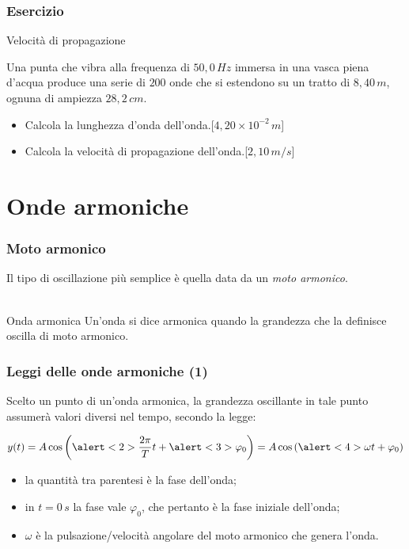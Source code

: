 \documentclass[]{beamer}
\theoremstyle{plain}
\begin{document}
\begin{frame}
\frametitle{Esercizio}
\begin{exampleblock}{Velocità di propagazione}
  \small{Una punta che vibra alla frequenza di $ 50,0 \, Hz $ immersa in una vasca piena d’acqua produce una serie di $ 200 $ onde che si estendono su un tratto di $ 8,40 \, m $, ognuna di ampiezza $ 28,2 \, cm $.
  \begin{itemize}
  \item Calcola la lunghezza d'onda dell'onda.\hspace*{\fill}[$ 4,20 \times 10^{-2} \, m $]
  \item Calcola la velocità di propagazione dell'onda.\hspace*{\fill}[$ 2,10 \, m/s $]
  \end{itemize}}
\end{exampleblock}
\end{frame}


\section{Onde armoniche}


\begin{frame}
\frametitle{Moto armonico}
  Il tipo di oscillazione più semplice è quella data da un \emph{moto armonico}.\\~\pause\\
  \begin{block}{Onda armonica}
    Un'onda si dice armonica quando la grandezza che la definisce oscilla di moto armonico.
  \end{block}
\end{frame}

\begin{frame}
  \frametitle{Leggi delle onde armoniche (1)}
  Scelto un punto di un'onda armonica, la grandezza oscillante in tale punto assumerà valori diversi nel tempo, secondo la legge:
  \begin{center}
  \colorbox{blue!30}{$ y(t) = A \cos \left( \alert<2>{ \dfrac{2\pi}{T}t + \alert<3>{\varphi_0} } \right) = A \cos \left( \alert<4>{\omega} t + \varphi_0 \right) $}
  \end{center}\pause
  \begin{itemize}
    \item la quantità tra parentesi è la \alert<2>{fase} dell'onda;\pause
    \item in $ t=0 \, s $ la fase vale $ \varphi_0 $, che pertanto è la \alert<3>{fase iniziale} dell'onda;\pause
    \item $ \omega $ è la \alert<4>{pulsazione/velocità angolare} del moto armonico che genera l'onda.
  \end{itemize}
\end{frame}
\end{document}
